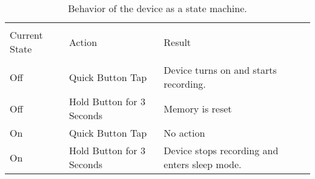\begin{table}[h]
\centering
\begin{tabular}{lll}
\hline
\\
Current State & Action                    & Result                                \\[2ex] \hline \\
Off           & Quick Button Tap          & Device turns on and starts recording. \\[2ex]
Off           & Hold Button for 3 Seconds & Memory is reset                       \\[2ex]
On            & Quick Button Tap          & No action                             \\[2ex]
On            & Hold Button for 3 Seconds & Device stops recording and enters sleep mode.\\[2ex] \hline
\end{tabular}
\caption{Behavior of the device as a state machine.}
\label{Tab:ButtonTable}
\end{table}